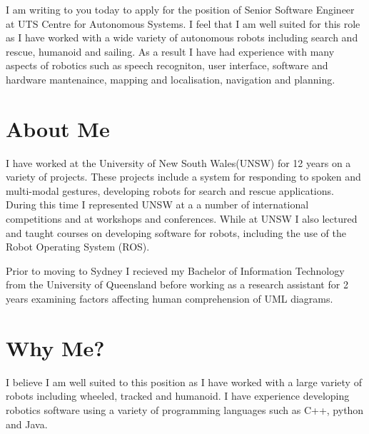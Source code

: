 \documentclass[11pt, a4paper]{awesome-deedy}
\begin{document}
\makecvheader

\makelettertitle

\begin{cvletter}

I am writing to you today to apply for the position of Senior Software Engineer at UTS Centre for Autonomous Systems.  I feel that I am well suited for this role as I have worked with a wide variety of autonomous robots including search and rescue, humanoid and sailing.  As a result I have had experience with many aspects of robotics such as speech recogniton, user interface, software and hardware mantenaince, mapping and localisation, navigation and planning. 

\section{About Me}

I have worked at the University of New South Wales(UNSW) for 12 years on a variety of projects.  These projects include a system for responding to spoken and multi-modal gestures, developing robots for search and rescue applications.  During this time I represented UNSW at a a number of international competitions and at workshops and conferences.  While at UNSW I also lectured and taught courses on developing software for robots, including the use of the Robot Operating System (ROS).

Prior to moving to Sydney I recieved my Bachelor of Information Technology from the University of Queensland before working as a research assistant for 2 years examining factors affecting human comprehension of UML diagrams.


\section{Why Me?}

I believe I am well suited to this position as I have worked with a large variety of robots including wheeled, tracked and humanoid.  I have experience developing robotics software using a variety of programming languages such as C++, python and Java.

\end{cvletter}

\makeletterclosing
\end{document}
